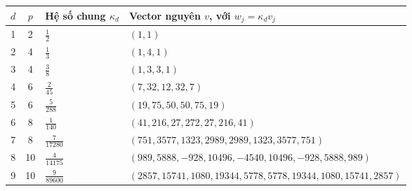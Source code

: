 \begin{longtable}{rcll}
\toprule
$d$ & $p$ & Hệ số chung $\kappa_d$ & Vector nguyên $v$, với $w_j=\kappa_d v_j$\\
\midrule
\endhead
1&2&$\frac{1}{2}$&\begin{minipage}[t]{.55\textwidth}\raggedright\small $(1,\allowbreak 1)$\end{minipage}\\[4pt]
2&4&$\frac{1}{3}$&\begin{minipage}[t]{.55\textwidth}\raggedright\small $(1,\allowbreak 4,\allowbreak 1)$\end{minipage}\\[4pt]
3&4&$\frac{3}{8}$&\begin{minipage}[t]{.55\textwidth}\raggedright\small $(1,\allowbreak 3,\allowbreak 3,\allowbreak 1)$\end{minipage}\\[4pt]
4&6&$\frac{2}{45}$&\begin{minipage}[t]{.55\textwidth}\raggedright\small $(7,\allowbreak 32,\allowbreak 12,\allowbreak 32,\allowbreak 7)$\end{minipage}\\[4pt]
5&6&$\frac{5}{288}$&\begin{minipage}[t]{.55\textwidth}\raggedright\small $(19,\allowbreak 75,\allowbreak 50,\allowbreak 50,\allowbreak 75,\allowbreak 19)$\end{minipage}\\[4pt]
6&8&$\frac{1}{140}$&\begin{minipage}[t]{.55\textwidth}\raggedright\small $(41,\allowbreak 216,\allowbreak 27,\allowbreak 272,\allowbreak 27,\allowbreak 216,\allowbreak 41)$\end{minipage}\\[4pt]
7&8&$\frac{7}{17280}$&\begin{minipage}[t]{.55\textwidth}\raggedright\small $(751,\allowbreak 3577,\allowbreak 1323,\allowbreak 2989,\allowbreak 2989,\allowbreak 1323,\allowbreak 3577,\allowbreak 751)$\end{minipage}\\[4pt]
8&10&$\frac{4}{14175}$&\begin{minipage}[t]{.55\textwidth}\raggedright\small $(989,\allowbreak 5888,\allowbreak -928,\allowbreak 10496,\allowbreak -4540,\allowbreak 10496,\allowbreak -928,\allowbreak 5888,\allowbreak 989)$\end{minipage}\\[4pt]
9&10&$\frac{9}{89600}$&\begin{minipage}[t]{.55\textwidth}\raggedright\small $(2857,\allowbreak 15741,\allowbreak 1080,\allowbreak 19344,\allowbreak 5778,\allowbreak 5778,\allowbreak 19344,\allowbreak 1080,\allowbreak 15741,\allowbreak 2857)$\end{minipage}\\[4pt]

\end{longtable}
